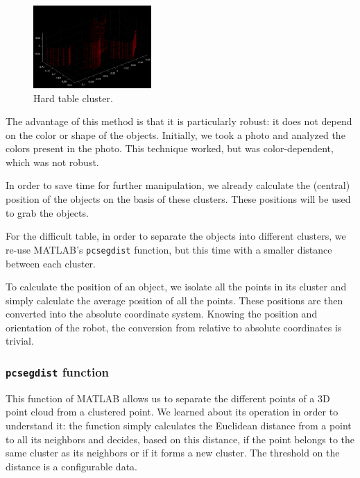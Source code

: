 \documentclass[a4paper, 10pt, conference]{ieeeconf}
\begin{document}
    \begin{figure}[!h]
        \centering
        \includegraphics[width=0.4\textwidth]{resources/png/clusters-hard.png}
        \caption{Hard table cluster.}
        \label{fig:manipulation.clusters.hard}
    \end{figure}
    
    The advantage of this method is that it is particularly robust: it does not depend on the color or shape of the objects. Initially, we took a photo and analyzed the colors present in the photo. This technique worked, but was color-dependent, which was not robust.
    
    In order to save time for further manipulation, we already calculate the (central) position of the objects on the basis of these clusters. These positions will be used to grab the objects.
    
    For the difficult table, in order to separate the objects into different clusters, we re-use MATLAB's \texttt{pcsegdist} function, but this time with a smaller distance between each cluster.
    
    To calculate the position of an object, we isolate all the points in its cluster and simply calculate the average position of all the points. These positions are then converted into the absolute coordinate system. Knowing the position and orientation of the robot, the conversion from relative to absolute coordinates is trivial.
    
    \subsubsection{\texttt{pcsegdist} function}
    
    This function of MATLAB allows us to separate the different points of a 3D point cloud from a clustered point. We learned about its operation in order to understand it: the function simply calculates the Euclidean distance from a point to all its neighbors and decides, based on this distance, if the point belongs to the same cluster as its neighbors or if it forms a new cluster. The threshold on the distance is a configurable data.
    
\end{document}
